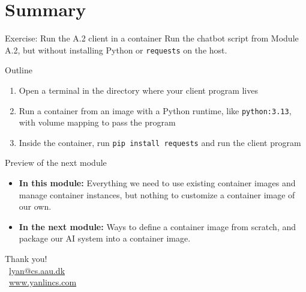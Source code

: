 \documentclass[aspectratio=169]{beamer}
\begin{document}
\section{Summary}


\begin{frame}{Exercise: Run the A.2 client in a container}
    Run the chatbot script from Module A.2, but without installing Python or \texttt{requests} on the host.

    \begin{block}{Outline}
        \begin{enumerate}
            \item Open a terminal in the directory where your client program lives
            \item Run a container from an image with a Python runtime, like \texttt{python:3.13}, with volume mapping to pass the program
            \item Inside the container, run \texttt{pip install requests} and run the client program
        \end{enumerate}
    \end{block}
\note{
}
\end{frame}


\begin{frame}{Preview of the next module}
\begin{itemize}
  \item \textbf{In this module:} Everything we need to use existing container images and manage container instances, but nothing to customize a container image of our own.
  \item \textbf{In the next module:} Ways to define a container image from scratch, and package our AI system into a container image.
\end{itemize}

\note{
}
\end{frame}



\appendix

\begin{frame}
\begin{center}
{\large Thank you!}
\vspace{1cm}
\\[0.5em]
{\small \faEnvelope\ \href{mailto:lyan@cs.aau.dk}{lyan@cs.aau.dk} \\
\faGlobe\ \href{https://www.yanlincs.com}{www.yanlincs.com}}
\end{center}
\note{
}
\end{frame}
\end{document}
